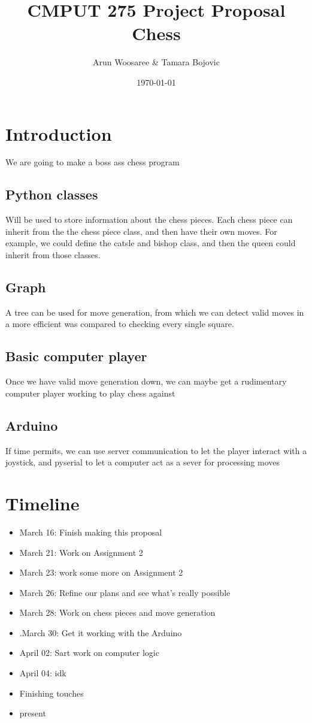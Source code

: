 \documentclass{article}
\title{CMPUT 275 Project Proposal\\
\vspace{.25cm}\large Chess \vspace{-.5cm}}
\author{\LARGE Arun Woosaree  \& Tamara Bojovic}
\date{\today}
\begin{document}
  \maketitle %

  \section{Introduction}
  We are going to make a boss ass chess program

    \subsection{Python classes}
    Will be used to store information about the chess pieces.
    Each chess piece can inherit from the the chess piece class, and then have
    their own moves. For example, we could define the catsle and bishop class, and then
    the queen could inherit from those classes.

    \subsection{Graph}
    A tree can be used for move generation, from which we can detect valid moves
    in a more efficient was compared to checking every single square.

    \subsection{Basic computer player}
    Once we have valid move generation down, we can maybe get a rudimentary
    computer player working to play chess against

    \subsection{Arduino}
    If time permits, we can use server communication to let the player
    interact with a joystick, and pyserial to let a computer act as a sever for processing moves




  \section{Timeline}

  \begin{itemize}
    \item March 16: Finish making this proposal
    \item March 21: Work on Assignment 2
    \item March 23: work some more on Assignment 2
    \item March 26: Refine our plans and see what's really possible
    \item March 28: Work on chess pieces and move generation
    \item.March 30: Get it working with the Arduino
    \item April 02: Sart work on computer logic
    \item April 04: idk
    \item Finishing touches
    \item present
  \end{itemize}
\end{document}
